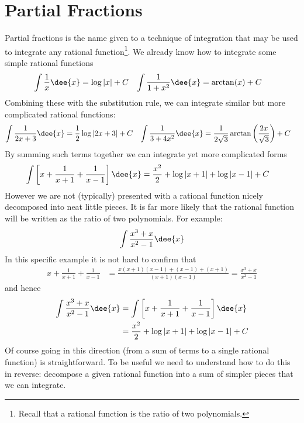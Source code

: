 \section{Partial Fractions}\label{sec parfrac}
Partial fractions is the name given to a technique of integration
that may be used to integrate any rational function\footnote{Recall that a rational
function is the ratio of two polynomials.}. We already know how to integrate some simple
rational
functions
\begin{align*}
  \int \frac{1}{x}\dee{x} &= \log|x|+C &
  \int \frac{1}{1+x^2} \dee{x} &= \arctan(x) +C
\end{align*}
Combining these with the substitution rule, we can integrate similar but more complicated
rational functions:
\begin{align*}
  \int \frac{1}{2x+3}\dee{x} &= \frac{1}{2} \log|2x+3| +C &
  \int \frac{1}{3+4x^2}\dee{x} &= \frac{1}{2\sqrt{3}} \arctan\left( \frac{2x}{\sqrt{3}}
\right) +C
\end{align*}
By summing such terms together we can integrate yet more complicated forms
\begin{align*}
  \int \left[ x + \frac{1}{x+1} + \frac{1}{x-1} \right]\dee{x}
  &= \frac{x^2}{2} + \log|x+1| + \log|x-1| +C
\end{align*}
However we are not (typically) presented with a rational function nicely decomposed into
neat little pieces. It is far more likely that the rational function will be written as
the ratio of two polynomials. For example:
\begin{align*}
  \int \frac{x^3+x}{x^2-1}\dee{x}
\end{align*}
In this specific example it is not hard to confirm that
\begin{align*}
x+\frac{1}{x+1} +\frac{1}{x-1}
&=\frac{x(x+1)(x-1) +(x-1) +(x+1)}{(x+1)(x-1)}
=\frac{x^3+x}{x^2-1}
\end{align*}
and hence
\begin{align*}
  \int \frac{x^3+x}{x^2-1}\dee{x}
&= \int \left[ x + \frac{1}{x+1} + \frac{1}{x-1} \right]\dee{x} \\
&= \frac{x^2}{2} + \log|x+1| + \log|x-1| +C
\end{align*}
Of course going in this direction (from a sum of terms to a single rational function) is
straightforward. To be useful we need to understand how to do this in reverse:
decompose a given rational function into a sum of simpler pieces that we can integrate.

